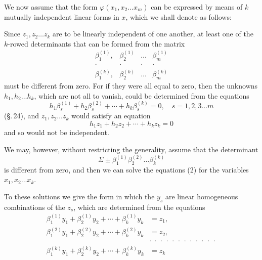 We now assume that the form $\varphi(x_1, x_2 \ldots x_m)$ can be
expressed by means of $k$ mutually independent linear forms in $x$,
which we shall denote as follows:

Since $z_1, z_2 \ldots z_k$ are to be linearly independent of one
another, at least one of the $k$-rowed determinants that can be formed
from the matrix
\[
\begin{matrix}
\beta_1^{(1)}, & \beta_2^{(1)} & \ldots & \beta_m^{(1)} \\
\cdot & \cdot & \cdot & \cdot \\
\beta_1^{(k)}, & \beta_2^{(k)} & \ldots & \beta_m^{(k)}
\end{matrix}
\]
must be different from zero. For if they were all equal to zero,
then the unknowns $h_1, h_2 \ldots h_k$, which are not all to vanish,
could be determined from the equations
\[
h_1 \beta_s^{(1)} + h_2 \beta_s^{(2)} + \cdots + h_k \beta_s^{(k)} = 0, \quad s = 1, 2, 3 \ldots m
\]
(\S.\,24), and $z_1, z_2 \ldots z_k$ would satisfy an equation
\[
h_1 z_1 + h_2 z_2 + \cdots + h_k z_k = 0
\]
and so would not be independent.

We may, however, without restricting the generality, assume
that the determinant
\[
\Sigma \pm \beta_1^{(1)}\beta_2^{(2)} \ldots \beta_k^{(k)}
\]
is different from zero, and then we can solve the equations
(2) for the variables $x_1, x_2 \ldots x_k$.

To these solutions we give the form
in which the $y_s$ are linear homogeneous combinations of the $z_s$,
which are determined from the equations
\[
\begin{aligned}
\beta_1^{(1)}y_1 + \beta_2^{(1)}y_2 + \cdots + \beta_k^{(1)}y_k &= z_1, \\
\beta_1^{(2)}y_1 + \beta_2^{(2)}y_2 + \cdots + \beta_k^{(2)}y_k &= z_2, \\
&\cdot\ \cdot\ \cdot\ \cdot\ \cdot\ \cdot\ \cdot\ \cdot\ \cdot\ \cdot\ \cdot\ \cdot \\
\beta_1^{(k)}y_1 + \beta_2^{(k)}y_2 + \cdots + \beta_k^{(k)}y_k &= z_k
\end{aligned}
\]
